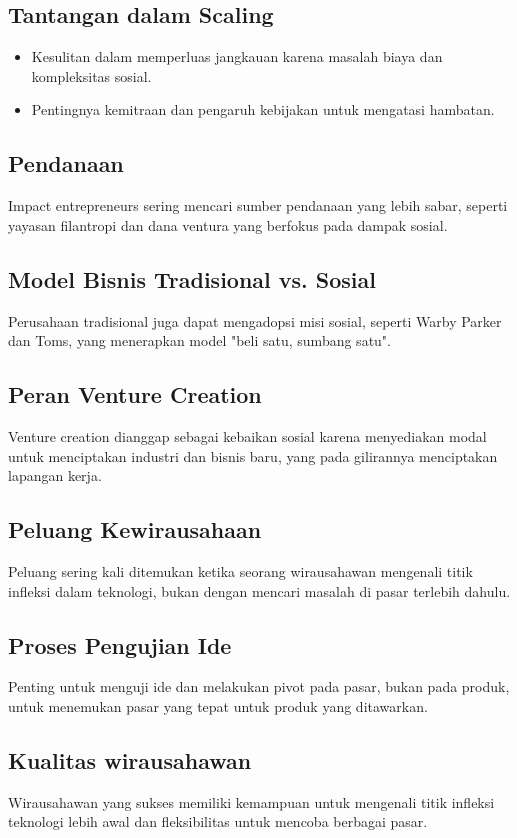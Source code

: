 \documentclass{article}
\begin{document}
\subsection{Tantangan dalam Scaling}
\begin{itemize}
    \item Kesulitan dalam memperluas jangkauan karena masalah biaya dan kompleksitas sosial.
    \item Pentingnya kemitraan dan pengaruh kebijakan untuk mengatasi hambatan.
\end{itemize}

\subsection{Pendanaan}
Impact entrepreneurs sering mencari sumber pendanaan yang lebih sabar, seperti yayasan filantropi dan dana ventura yang berfokus pada dampak sosial.

\subsection{Model Bisnis Tradisional vs. Sosial}
Perusahaan tradisional juga dapat mengadopsi misi sosial, seperti Warby Parker dan Toms, yang menerapkan model "beli satu, sumbang satu".

\subsection{Peran Venture Creation}
Venture creation dianggap sebagai kebaikan sosial karena menyediakan modal untuk menciptakan industri dan bisnis baru, yang pada gilirannya menciptakan lapangan kerja.

\subsection{Peluang Kewirausahaan}
Peluang sering kali ditemukan ketika seorang wirausahawan mengenali titik infleksi dalam teknologi, bukan dengan mencari masalah di pasar terlebih dahulu.

\subsection{Proses Pengujian Ide}
Penting untuk menguji ide dan melakukan pivot pada pasar, bukan pada produk, untuk menemukan pasar yang tepat untuk produk yang ditawarkan.

\subsection{Kualitas wirausahawan}
Wirausahawan yang sukses memiliki kemampuan untuk mengenali titik infleksi teknologi lebih awal dan fleksibilitas untuk mencoba berbagai pasar.
\end{document}
